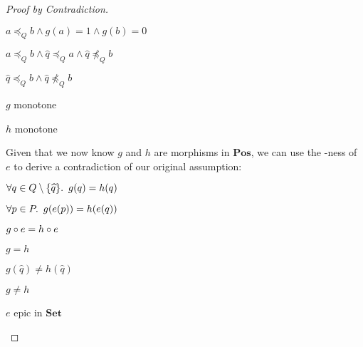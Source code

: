 \begin{lemma}
\begin{proof}[Proof by Contradiction]
\begin{itemize}
\begin{itemize}
          \step[\imps]
            $a\preceq_Qb\wedge g(a) = 1\wedge g(b) = 0$

          \step[\imps]
            $a\preceq_Qb\wedge \widehat{q}\preceq_Qa\wedge \widehat{q}\npreceq_Qb$

          \step[\imps]
            $\widehat{q}\preceq_Qb\wedge \widehat{q}\npreceq_Qb$
        \end{itemize}

      \step[\contras] $g$ monotone
        \marginnote{\Contra}

      \step $h$ monotone

      \addtolength{\itemsep}{.5\baselineskip}
      \step Given that we now know $g$ and $h$ are morphisms in $\mathbf{Pos}$, we can use the \Epic-ness of $e$ to derive a contradiction of our original assumption:

      \step
        \begin{itemize}
          \subp{\dagger}
            $\forall q\in Q\setminus\{\widehat{q}\}\ldotp~g(q) = h(q)$

          \step[\imps]
            $\forall p\in P\ldotp~g(e(p)) = h(e(q))$


          \step[\iffs]
            $g\circ e = h\circ e$
            \marginnote{\Def-$=$}

          \step[\imps]
            $g = h$
        \end{itemize}
      \addtolength{\itemsep}{-.5\baselineskip}

      \step
        \begin{itemize}
          \subp{\ddagger}
            $g(\widehat{q})\neq h(\widehat{q})$

          \step[\imps]
            $g\neq h$
            \marginnote{\Def-$\neq$}
        \end{itemize}

        \step[\contras] $e$ epic in $\mathbf{Set}$
          \qedhere
          \marginnote{\Contra-$\dagger$}
    \end{itemize}
  \end{proof}
\end{lemma}

